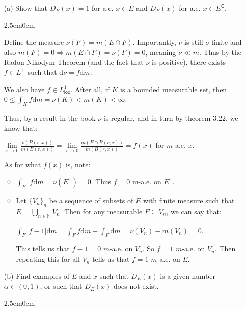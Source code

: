 \documentclass{book}
\newcommand{\exTwoP}{%
   \color{RedViolet}%
   \fontsize{13}{15}\selectfont%
}
\newenvironment{myIndent}{%
   \begin{adjustwidth}{2.5em}{0em}%
}{%
   \end{adjustwidth}%
}
\newcommand{\comp}{\mathsf{C}}
\newcommand{\df}{\mathrm{d}}
\newcommand{\loc}{\mathsf{loc}}
\newcommand{\retTwo}{\hfill\bigbreak}
\begin{document}
\begin{enumerate}
	\item[(a)] Show that $D_E(x) = 1$ for a.e. $x \in E$ and $D_E(x)$ for a.e. $x \in E^\comp$.
	
	\begin{myIndent}\exTwoP
		Define the measure $\nu(F) = m(E \cap F)$. Importantly, $\nu$ is still $\sigma$-finite and also $m(F) = 0 \Longrightarrow m(E \cap F) = \nu(F) = 0$, meaning $\nu \ll m$. Thus by the Radon-Nikodym Theorem (and the fact that $\nu$ is positive), there exists $f \in L^+$ such that $\df\nu = f \df m$.\retTwo

		We also have $f \in L^1_{\loc}$. After all, if $K$ is a bounded measurable set, then\\ $0 \leq \int_K f \df m = \nu(K) < m(K) < \infty$. 
		\newpage

		Thus, by a result in the book $\nu$ is regular, and in turn by theorem 3.22, we know that:
		
		{\centering $\lim\limits_{r \rightarrow 0}\frac{\nu(B(r,x))}{m(B(r,x))} = \lim\limits_{r \rightarrow 0}\frac{m(E \cap B(r,x))}{m(B(r,x))} = f(x)$ for $m$-a.e. $x$.\retTwo\par}

		As for what $f(x)$ is, note:
		\begin{itemize}
			\item $\int_{E^\comp}f\df m = \nu(E^\comp) = 0$. Thus $f = 0$ m-a.e. on $E^\comp$.
			\item Let $\{V_n\}_n$ be a sequence of subsets of $E$ with finite measure such that\\ $E = \bigcup_{n \in \mathbb{N}} V_n$. Then for any measurable $F \subseteq V_n$, we can say that:\\ [-8pt]
			
			{\centering $\int_{F}|f - 1|\df m = \int_{F}f \df m - \int_{F}\df m = \nu(V_n) - m(V_n) = 0$.\\ [4pt]\par}

			This tells us that $f - 1 = 0$ $m$-a.e. on $V_n$. So $f = 1$ $m$-a.e. on $V_n$. Then repeating this for all $V_n$ tells us that $f = 1$ $m$-a.e. on $E$.
		\end{itemize}
		\retTwo
	\end{myIndent}

	\item[(b)] Find examples of $E$ and $x$ such that $D_E(x)$ is a given number $\alpha \in (0, 1)$, or such that $D_E(x)$ does not exist.
	
	\begin{myIndent}\exTwoP
		
		\retTwo
	\end{myIndent}
\end{enumerate}
\end{document}
